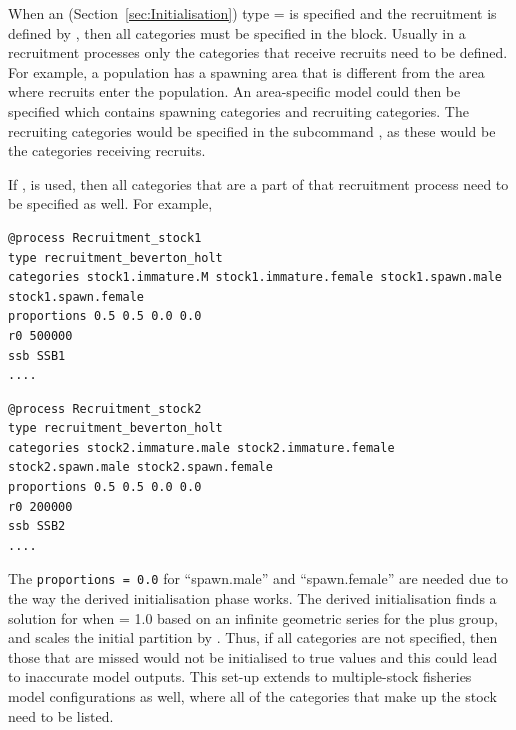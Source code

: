 When an  (Section~\ref{sec:Initialisation}) type =  is specified and the recruitment is defined by , then all categories must be specified in the  block. Usually in a recruitment processes only the categories that receive recruits need to be defined. For example, a population has a spawning area that is different from the area where recruits enter the population. An area-specific model could then be specified which contains spawning categories and recruiting categories. The recruiting categories would be specified in the subcommand , as these would be the categories receiving recruits.

If ,  is used, then all categories that are a part of that recruitment process need to be specified as well. For example,

{\small{\begin{verbatim}
@process Recruitment_stock1
type recruitment_beverton_holt
categories stock1.immature.M stock1.immature.female stock1.spawn.male stock1.spawn.female
proportions 0.5 0.5 0.0 0.0
r0 500000
ssb SSB1
....
\end{verbatim}}}

{\small{\begin{verbatim}
@process Recruitment_stock2
type recruitment_beverton_holt
categories stock2.immature.male stock2.immature.female stock2.spawn.male stock2.spawn.female
proportions 0.5 0.5 0.0 0.0
r0 200000
ssb SSB2
....
\end{verbatim}}}

The \texttt{proportions = 0.0} for \enquote{spawn.male} and \enquote{spawn.female} are needed due to the way the derived initialisation phase works. The derived initialisation finds a solution for when  = 1.0 based on an infinite geometric series for the plus group, and scales the initial partition by . Thus, if all categories are not specified, then those that are missed would not be initialised to true values and this could lead to inaccurate model outputs. This set-up extends to multiple-stock fisheries model configurations as well, where all of the categories that make up the stock need to be listed.

\subsubsection{\label{sec:Process-Ageing}}

